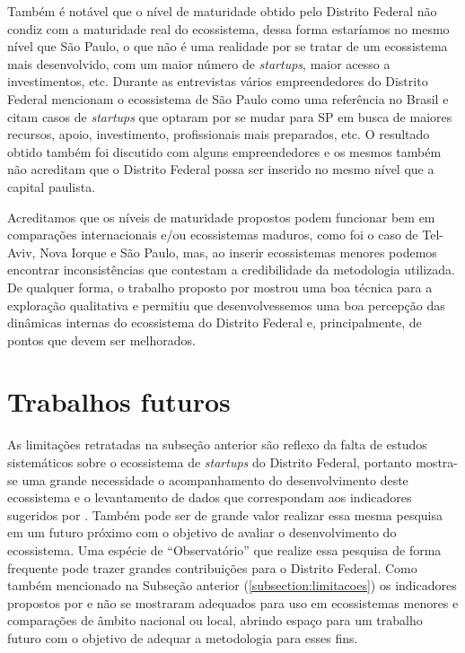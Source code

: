 Também é notável que o nível de maturidade obtido pelo Distrito Federal não condiz com a maturidade real do ecossistema, dessa forma estaríamos no mesmo nível que São Paulo, o que não é uma realidade por se tratar de um ecossistema mais desenvolvido, com um maior número de \textit{startups}, maior acesso a investimentos, etc. Durante as entrevistas vários empreendedores do Distrito Federal mencionam o ecossistema de São Paulo como uma referência no Brasil e citam casos de \textit{startups} que optaram por se mudar para SP em busca de maiores recursos, apoio, investimento, profissionais mais preparados, etc. O resultado obtido também foi discutido com alguns empreendedores e os mesmos também não acreditam que o Distrito Federal possa ser inserido no mesmo nível que a capital paulista.

Acreditamos que os níveis de maturidade propostos podem funcionar bem em comparações internacionais e/ou ecossistemas maduros, como foi o caso de Tel-Aviv, Nova Iorque e São Paulo, mas, ao inserir ecossistemas menores podemos encontrar inconsistências que contestam a credibilidade da metodologia utilizada. De qualquer forma, o trabalho proposto por  mostrou uma boa técnica para a exploração qualitativa e permitiu que desenvolvessemos uma boa percepção das dinâmicas internas do ecossistema do Distrito Federal e, principalmente, de pontos que devem ser melhorados.

\section{Trabalhos futuros}
\label{subsection:trabalhos_futuros}

As limitações retratadas na subseção anterior são reflexo da falta de estudos sistemáticos sobre o ecossistema de \textit{startups} do Distrito Federal, portanto mostra-se uma grande necessidade o acompanhamento do desenvolvimento deste ecossistema e o levantamento de dados que correspondam aos indicadores sugeridos por . Também pode ser de grande valor realizar essa mesma pesquisa em um futuro próximo com o objetivo de avaliar o desenvolvimento do ecossistema. Uma espécie de ``Observatório'' que realize essa pesquisa de forma frequente pode trazer grandes contribuições para o Distrito Federal. Como também mencionado na Subseção anterior (\ref{subsection:limitacoes}) os indicadores propostos por  e  não se mostraram adequados para uso em ecossistemas menores e comparações de âmbito nacional ou local, abrindo espaço para um trabalho futuro com o objetivo de adequar a metodologia para esses fins.

